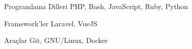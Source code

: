 
\begin{cvskills}
  \cvskill
    {Programlama Dilleri} %
    {PHP, Bash, JavaScript, Ruby, Python} %

  \cvskill
    {Framework'ler} %
    {Laravel, VueJS} %

  \cvskill
    {Araçlar} %
    {Git, GNU/Linux, Docker} %
\end{cvskills}
